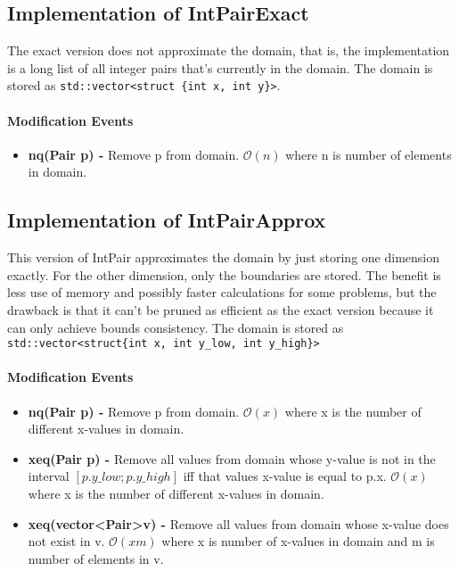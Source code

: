 \documentclass[a4paper,11pt]{article}
\begin{document}
\subsection{Implementation of IntPairExact}
The exact version does not approximate the domain, that is, the implementation is a long list of all integer pairs that's currently in the domain. The domain is stored as \texttt{std::vector<struct \{int x, int y\}>}. 

\paragraph{Modification Events}
\begin{itemize}
\item {\textbf{nq(Pair p) - }} Remove p from domain. $\mathcal{O}(n)$ where n is number of elements in domain.
\end{itemize}
\subsection{Implementation of IntPairApprox}
This version of IntPair approximates the domain by just storing one dimension exactly. For the other dimension, only the boundaries are stored. The benefit is less use of memory and possibly faster calculations for some problems, but the drawback is that it can't be pruned as efficient as the exact version because it can only achieve bounds consistency. The domain is stored as \texttt{std::vector<struct\{int x, int y\_low, int y\_high\}>}

\paragraph{Modification Events}
\begin{itemize}
\item {\textbf{nq(Pair p) - }} Remove p from domain. $\mathcal{O}(x)$ where x is the number of different x-values in domain.
\item{\textbf{xeq(Pair p) - }} Remove all values from domain whose y-value is not in the interval $[p.y\_low; p.y\_high]$ iff that values x-value is equal to p.x. $\mathcal{O}(x)$ where x is the number of different x-values in domain.
\item{\textbf{xeq(vector\textless Pair\textgreater v) - }} Remove all values from domain whose x-value does not exist in v. $\mathcal{O}(xm)$ where x is number of x-values in domain and m is number of elements in v.
\end{itemize}
\end{document}
